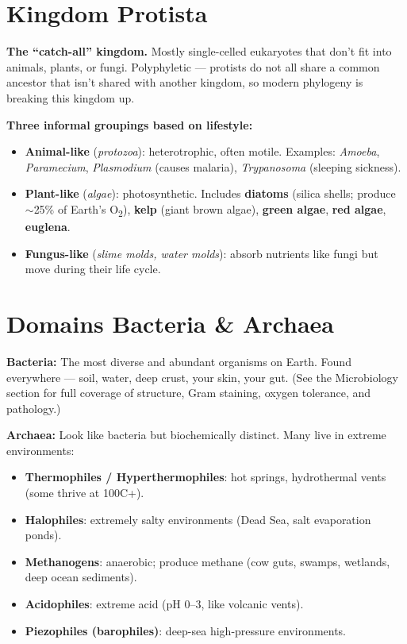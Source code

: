\documentclass[11pt, letterpaper]{article}
\begin{document}
\section*{Kingdom Protista}

\textbf{The ``catch-all'' kingdom.} Mostly single-celled eukaryotes that don't fit into
animals, plants, or fungi. Polyphyletic --- protists do not all share a common ancestor that
isn't shared with another kingdom, so modern phylogeny is breaking this kingdom up.

\textbf{Three informal groupings based on lifestyle:}
\begin{itemize}[noitemsep]
  \item \textbf{Animal-like} (\emph{protozoa}): heterotrophic, often motile. Examples: \textit{Amoeba}, \textit{Paramecium}, \textit{Plasmodium} (causes malaria), \textit{Trypanosoma} (sleeping sickness).
  \item \textbf{Plant-like} (\emph{algae}): photosynthetic. Includes \textbf{diatoms} (silica shells; produce $\sim$25\% of Earth's O\textsubscript{2}), \textbf{kelp} (giant brown algae), \textbf{green algae}, \textbf{red algae}, \textbf{euglena}.
  \item \textbf{Fungus-like} (\emph{slime molds, water molds}): absorb nutrients like fungi but move during their life cycle.
\end{itemize}

\section*{Domains Bacteria \& Archaea}

\textbf{Bacteria:} The most diverse and abundant organisms on Earth. Found everywhere ---
soil, water, deep crust, your skin, your gut. (See the Microbiology section for full coverage
of structure, Gram staining, oxygen tolerance, and pathology.)

\textbf{Archaea:} Look like bacteria but biochemically distinct. Many live in extreme environments:

\begin{itemize}[noitemsep]
  \item \textbf{Thermophiles / Hyperthermophiles}: hot springs, hydrothermal vents (some thrive at 100\textdegree C+).
  \item \textbf{Halophiles}: extremely salty environments (Dead Sea, salt evaporation ponds).
  \item \textbf{Methanogens}: anaerobic; produce methane (cow guts, swamps, wetlands, deep ocean sediments).
  \item \textbf{Acidophiles}: extreme acid (pH 0--3, like volcanic vents).
  \item \textbf{Piezophiles (barophiles)}: deep-sea high-pressure environments.
\end{itemize}
\end{document}
